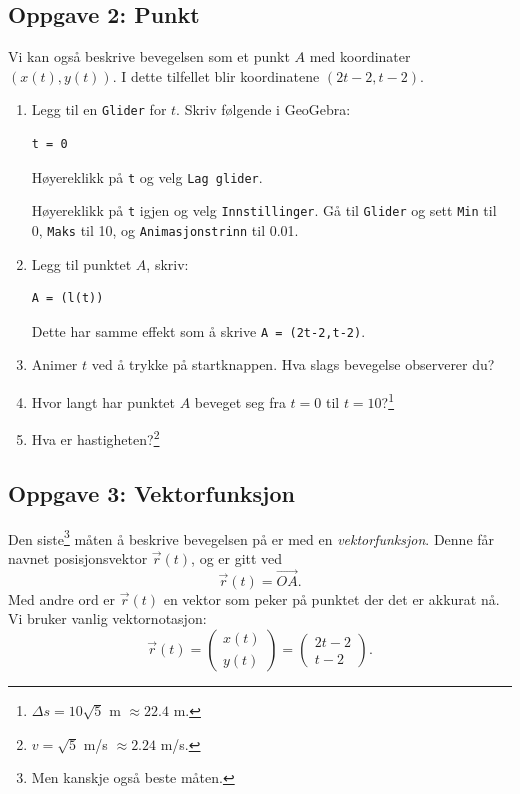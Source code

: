 \documentclass[a4paper,12pt]{article}
\begin{document}
\subsection*{Oppgave 2: Punkt}

Vi kan også beskrive bevegelsen som et punkt $A$ med koordinater $(x(t),y(t))$. I dette tilfellet blir koordinatene $(2t-2,t-2)$.

\begin{enumerate}[label=\alph*)]
\item Legg til en \lstinline{Glider} for $t$. Skriv følgende i GeoGebra:
\begin{lstlisting}
t = 0
\end{lstlisting}
Høyereklikk på \lstinline{t} og velg \lstinline{Lag glider}.

Høyereklikk på \lstinline{t} igjen og velg \lstinline{Innstillinger}. Gå til \lstinline{Glider} og sett \lstinline{Min} til 0, \lstinline{Maks} til 10, og \lstinline{Animasjonstrinn} til 0.01.

\item Legg til punktet $A$, skriv:
\begin{lstlisting}
A = (l(t))
\end{lstlisting}
Dette har samme effekt som å skrive \lstinline{A = (2t-2,t-2)}.
\item Animer $t$ ved å trykke på startknappen. Hva slags bevegelse observerer du?
\item Hvor langt har punktet $A$ beveget seg fra $t=0$ til $t=10$?\footnote{$\Delta s = 10\sqrt{5}$ m $\approx 22.4$ m.}
\item Hva er hastigheten?\footnote{$v = \sqrt 5$ m/s $\approx 2.24$ m/s.}
\end{enumerate}

\subsection*{Oppgave 3: Vektorfunksjon}

Den siste\footnote{Men kanskje også beste måten.} måten å beskrive bevegelsen på er med en \textit{vektorfunksjon}. Denne får navnet posisjonsvektor $\vec r(t)$, og er gitt ved
\[\vec r(t) = \overrightarrow{OA}.\]
Med andre ord er $\vec r (t)$ en vektor som peker på punktet der det er akkurat nå. Vi bruker vanlig vektornotasjon:
\[
\vec r(t) = 
\begin{pmatrix}
x(t) \\
y(t)
\end{pmatrix} =
\begin{pmatrix}
2t-2 \\
t-2
\end{pmatrix}.
\]
\end{document}
